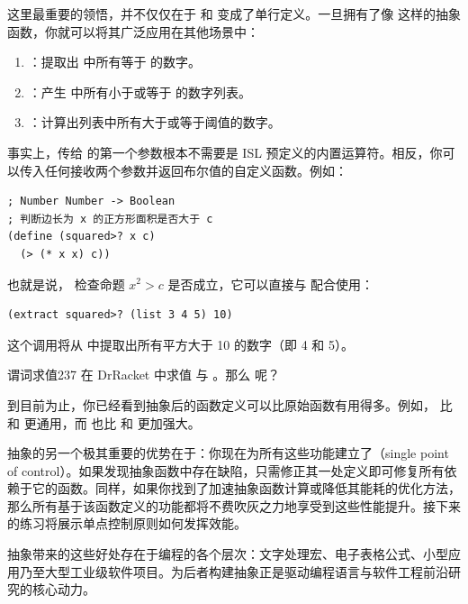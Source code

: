 这里最重要的领悟，并不仅仅在于  和  变成了单行定义。一旦拥有了像  这样的抽象函数，你就可以将其广泛应用在其他场景中：

\begin{enumerate}
  \item {}：提取出  中所有等于  的数字。
  \item {}：产生  中所有小于或等于  的数字列表。
  \item {}：计算出列表中所有大于或等于阈值的数字。
\end{enumerate}

事实上，传给  的第一个参数根本不需要是 ISL 预定义的内置运算符。相反，你可以传入任何接收两个参数并返回布尔值的自定义函数。例如：

\begin{lstlisting}[language=BSL]
; Number Number -> Boolean
; 判断边长为 x 的正方形面积是否大于 c
(define (squared>? x c)
  (> (* x x) c))
\end{lstlisting}

也就是说， 检查命题 $x^2 > c$ 是否成立，它可以直接与  配合使用：

\begin{lstlisting}[language=BSL]
(extract squared>? (list 3 4 5) 10)
\end{lstlisting}

这个调用将从  中提取出所有平方大于 10 的数字（即 4 和 5）。

\begin{exercise}{谓词求值}{237}
在 DrRacket 中求值  与 。那么  呢？
\end{exercise}

到目前为止，你已经看到抽象后的函数定义可以比原始函数有用得多。例如， 比  和  更通用，而  也比  和  更加强大。

抽象的另一个极其重要的优势在于：你现在为所有这些功能建立了（single point of control）。如果发现抽象函数中存在缺陷，只需修正其一处定义即可修复所有依赖于它的函数。同样，如果你找到了加速抽象函数计算或降低其能耗的优化方法，那么所有基于该函数定义的功能都将不费吹灰之力地享受到这些性能提升。接下来的练习将展示单点控制原则如何发挥效能。

\begin{notebox}[单点控制原则的普适价值]
抽象带来的这些好处存在于编程的各个层次：文字处理宏、电子表格公式、小型应用乃至大型工业级软件项目。为后者构建抽象正是驱动编程语言与软件工程前沿研究的核心动力。
\end{notebox}

